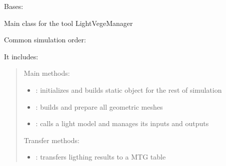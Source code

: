 \documentclass[letterpaper,10pt,english]{sphinxmanual}
\begin{document}
\begin{fulllineitems}
\label{\detokenize{reference:LVM.LightVegeManager}}
\pysigstartsignatures
{}
\pysigstopsignatures
\sphinxAtStartPar
Bases: 

\sphinxAtStartPar
Main class for the tool LightVegeManager

\sphinxAtStartPar
Common simulation order:

\sphinxAtStartPar
{}

\sphinxAtStartPar
It includes:
\begin{quote}

\sphinxAtStartPar
Main methods:
\begin{itemize}
\item {} 
\sphinxAtStartPar
{}: initializes and builds static object for the rest of simulation

\item {} 
\sphinxAtStartPar
{\hyperref[\detokenize{reference:LVM.LightVegeManager.build}]{}}: builds and prepare all geometric meshes

\item {} 
\sphinxAtStartPar
{\hyperref[\detokenize{reference:LVM.LightVegeManager.run}]{}}: calls a light model and manages its inputs and outputs

\end{itemize}

\sphinxAtStartPar
Transfer methods:
\begin{itemize}
\item {} 
\sphinxAtStartPar
{\hyperref[\detokenize{reference:LVM.LightVegeManager.to_MTG}]{}}: transfers ligthing results to a MTG table


\end{itemize}
\end{quote}
\end{fulllineitems}
\end{document}
